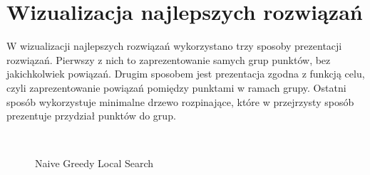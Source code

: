 \documentclass[main.tex]{subfiles}
\begin{document}
\section{Wizualizacja najlepszych rozwiązań}
W wizualizacji najlepszych rozwiązań wykorzystano trzy sposoby prezentacji rozwiązań. Pierwszy z nich to zaprezentowanie samych grup punktów, bez jakichkolwiek powiązań. Drugim sposobem jest prezentacja zgodna z funkcją celu, czyli zaprezentowanie powiązań pomiędzy punktami w ramach grupy. Ostatni sposób wykorzystuje minimalne drzewo rozpinające, które w przejrzysty sposób prezentuje przydział punktów do grup.

\begin{figure}[H]
     \begin{center}
        \\
    \end{center}
    \caption{Naive Greedy Local Search}
\end{figure}
\end{document}
